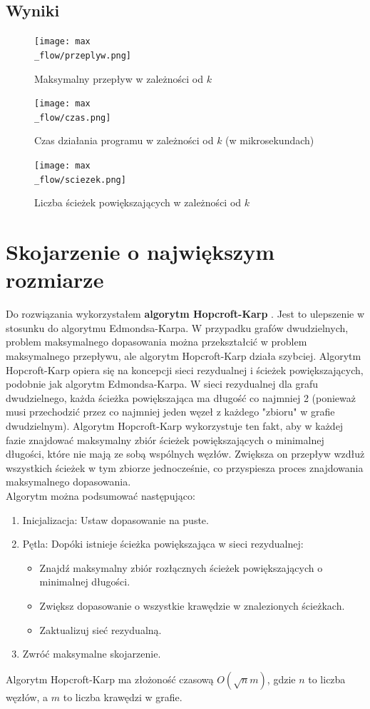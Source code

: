 \documentclass{article}
\begin{document}
\subsection*{Wyniki}
\begin{figure}[H]
    \centering
    \texttt{[image: max\\\_flow/przeplyw.png]}
    \caption{Maksymalny przepływ w zależności od $k$}
\end{figure}
\begin{figure}[H]
    \centering
    \texttt{[image: max\\\_flow/czas.png]}
    \caption{Czas działania programu w zależności od $k$ (w mikrosekundach)}
\end{figure}
\begin{figure}[H]
    \centering
    \texttt{[image: max\\\_flow/sciezek.png]}
    \caption{Liczba ścieżek powiększających w zależności od $k$}
\end{figure}

\section*{Skojarzenie o największym rozmiarze}
Do rozwiązania wykorzystałem \textbf{algorytm Hopcroft-Karp} . Jest to ulepszenie w stosunku do algorytmu Edmondsa-Karpa. W przypadku grafów dwudzielnych, problem maksymalnego dopasowania można przekształcić w problem maksymalnego przepływu, ale algorytm Hopcroft-Karp działa szybciej. Algorytm Hopcroft-Karp opiera się na koncepcji sieci rezydualnej i ścieżek powiększających, podobnie jak algorytm Edmondsa-Karpa. W sieci rezydualnej dla grafu dwudzielnego, każda ścieżka powiększająca ma długość co najmniej 2 (ponieważ musi przechodzić przez co najmniej jeden węzeł z każdego "zbioru" w grafie dwudzielnym). Algorytm Hopcroft-Karp wykorzystuje ten fakt, aby w każdej fazie znajdować maksymalny zbiór ścieżek powiększających o minimalnej długości, które nie mają ze sobą wspólnych węzłów. Zwiększa on przepływ wzdłuż wszystkich ścieżek w tym zbiorze jednocześnie, co przyspiesza proces znajdowania maksymalnego dopasowania.\\
Algorytm można podsumować następująco:
\begin{enumerate}
\item Inicjalizacja: Ustaw dopasowanie na puste.
\item Pętla: Dopóki istnieje ścieżka powiększająca w sieci rezydualnej:
\begin{itemize}
\item Znajdź maksymalny zbiór rozłącznych ścieżek powiększających o minimalnej długości.
\item Zwiększ dopasowanie o wszystkie krawędzie w znalezionych ścieżkach.
\item Zaktualizuj sieć rezydualną.
\end{itemize}
\item Zwróć maksymalne skojarzenie.
\end{enumerate}
Algorytm Hopcroft-Karp ma złożoność czasową $O(\sqrt{n}m)$, gdzie $n$ to liczba węzłów, a $m$ to liczba krawędzi w grafie.
\end{document}

